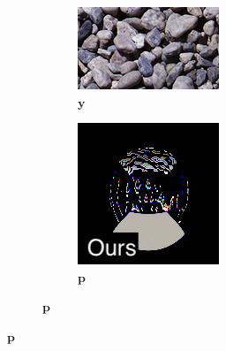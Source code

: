 \begin{figure}[]
\begin{subfigure}{\textwidth}
        \begin{subfigure}{0.19\textwidth}
            \centering
            \includegraphics[width=\textwidth]{images/04-experiment03/ball_pebble_target.jpg}
            \caption*{\(\bm{y}\)}
        \end{subfigure}
        \hfill
        \begin{subfigure}{0.19\textwidth}
            \centering
            \includegraphics[width=\textwidth]{images/04-experiment03/ball_dof/pebbles/stats_im_label.jpg}
            \caption*{\(\bm{p}\)}

\end{subfigure}
\end{subfigure}
\end{figure}
